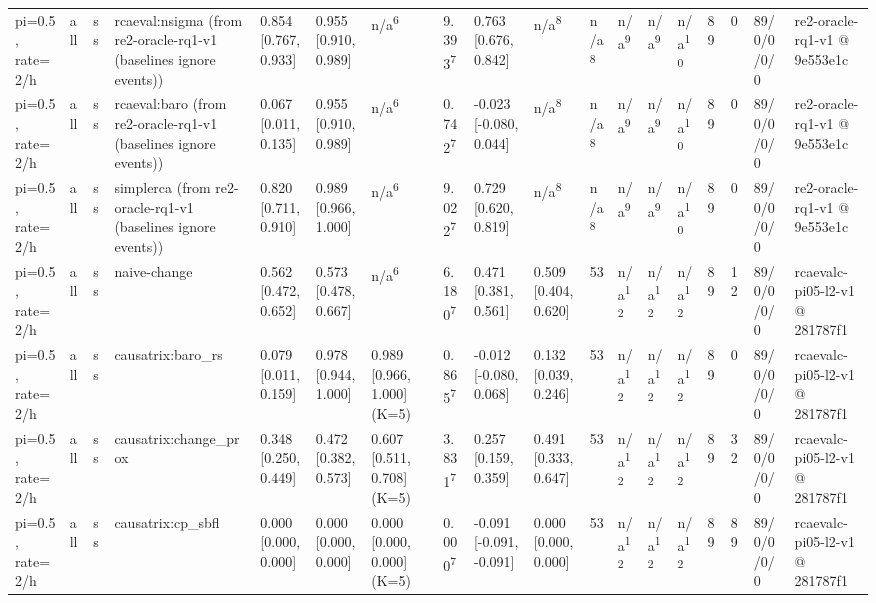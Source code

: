 \begin{table}[t]
\begin{tabular}{llllllllllllllllll}
pi=0.5, rate=2/h & all & ss & rcaeval:nsigma (from re2-oracle-rq1-v1 (baselines ignore events)) & 0.854 [0.767, 0.933] & 0.955 [0.910, 0.989] & n/a\textsuperscript{6} & 9.393\textsuperscript{7} & 0.763 [0.676, 0.842] & n/a\textsuperscript{8} & n/a\textsuperscript{8} & n/a\textsuperscript{9} & n/a\textsuperscript{9} & n/a\textsuperscript{10} & 89 & 0 & 89/0/0/0/0 & re2-oracle-rq1-v1 @ 9e553e1c \\
pi=0.5, rate=2/h & all & ss & rcaeval:baro (from re2-oracle-rq1-v1 (baselines ignore events)) & 0.067 [0.011, 0.135] & 0.955 [0.910, 0.989] & n/a\textsuperscript{6} & 0.742\textsuperscript{7} & -0.023 [-0.080, 0.044] & n/a\textsuperscript{8} & n/a\textsuperscript{8} & n/a\textsuperscript{9} & n/a\textsuperscript{9} & n/a\textsuperscript{10} & 89 & 0 & 89/0/0/0/0 & re2-oracle-rq1-v1 @ 9e553e1c \\
pi=0.5, rate=2/h & all & ss & simplerca (from re2-oracle-rq1-v1 (baselines ignore events)) & 0.820 [0.711, 0.910] & 0.989 [0.966, 1.000] & n/a\textsuperscript{6} & 9.022\textsuperscript{7} & 0.729 [0.620, 0.819] & n/a\textsuperscript{8} & n/a\textsuperscript{8} & n/a\textsuperscript{9} & n/a\textsuperscript{9} & n/a\textsuperscript{10} & 89 & 0 & 89/0/0/0/0 & re2-oracle-rq1-v1 @ 9e553e1c \\
pi=0.5, rate=2/h & all & ss & naive-change & 0.562 [0.472, 0.652] & 0.573 [0.478, 0.667] & n/a\textsuperscript{6} & 6.180\textsuperscript{7} & 0.471 [0.381, 0.561] & 0.509 [0.404, 0.620] & 53 & n/a\textsuperscript{12} & n/a\textsuperscript{12} & n/a\textsuperscript{12} & 89 & 12 & 89/0/0/0/0 & rcaevalc-pi05-l2-v1 @ 281787f1 \\
pi=0.5, rate=2/h & all & ss & causatrix:baro\_rs & 0.079 [0.011, 0.159] & 0.978 [0.944, 1.000] & 0.989 [0.966, 1.000] (K=5) & 0.865\textsuperscript{7} & -0.012 [-0.080, 0.068] & 0.132 [0.039, 0.246] & 53 & n/a\textsuperscript{12} & n/a\textsuperscript{12} & n/a\textsuperscript{12} & 89 & 0 & 89/0/0/0/0 & rcaevalc-pi05-l2-v1 @ 281787f1 \\
pi=0.5, rate=2/h & all & ss & causatrix:change\_prox & 0.348 [0.250, 0.449] & 0.472 [0.382, 0.573] & 0.607 [0.511, 0.708] (K=5) & 3.831\textsuperscript{7} & 0.257 [0.159, 0.359] & 0.491 [0.333, 0.647] & 53 & n/a\textsuperscript{12} & n/a\textsuperscript{12} & n/a\textsuperscript{12} & 89 & 32 & 89/0/0/0/0 & rcaevalc-pi05-l2-v1 @ 281787f1 \\
pi=0.5, rate=2/h & all & ss & causatrix:cp\_sbfl & 0.000 [0.000, 0.000] & 0.000 [0.000, 0.000] & 0.000 [0.000, 0.000] (K=5) & 0.000\textsuperscript{7} & -0.091 [-0.091, -0.091] & 0.000 [0.000, 0.000] & 53 & n/a\textsuperscript{12} & n/a\textsuperscript{12} & n/a\textsuperscript{12} & 89 & 89 & 89/0/0/0/0 & rcaevalc-pi05-l2-v1 @ 281787f1 \\

\end{tabular}
\end{table}
